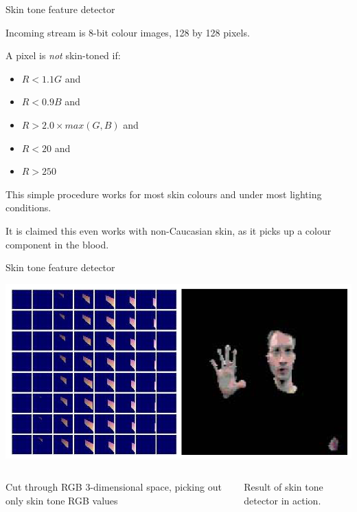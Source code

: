 \documentclass[compress]{beamer}
\begin{document}

\begin{frame}{Skin tone feature detector}

    Incoming stream is 8-bit colour images, 128 by 128 pixels.



    A pixel is \emph{not} skin-toned if:

\begin{itemize}
\item $R < 1.1 G$ and
\item $R < 0.9 B$ and
\item $R > 2.0 \times max(G,B)$ and
\item $R < 20$ and
\item $R > 250$
\end{itemize}

This simple procedure works for most skin colours and under most
lighting conditions.

  It is claimed this even works with non-Caucasian skin, as it picks up
  a colour component in the blood.


\end{frame}

\begin{frame}{Skin tone feature detector}

    \begin{center}
        \includegraphics[width=\linewidth]{skin-tone}
    \end{center}

    \begin{columns}
        \begin{column}{0.5\linewidth}
            Cut through RGB 3-dimensional space, picking out only skin tone RGB
            values


        \end{column}
        \begin{column}{0.5\linewidth}
            Result of skin tone detector in action.
        \end{column}
    \end{columns}

\end{frame}
\end{document}
